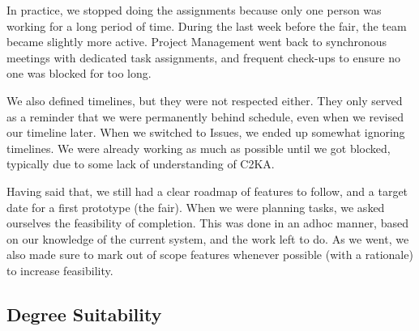In practice, we stopped doing the assignments because only one person was working for a long period of time.
During the last week before the fair, the team became slightly more active.
Project Management went back to synchronous meetings with dedicated task assignments,
and frequent check-ups to ensure no one was blocked for too long.

We also defined timelines, but they were not respected either.
They only served as a reminder that we were permanently behind schedule, even when we revised our timeline later.
When we switched to Issues, we ended up somewhat ignoring timelines.
We were already working as much as possible until we got blocked, typically due to some lack of understanding of C2KA\@.

Having said that, we still had a clear roadmap of features to follow, and a target date for a first prototype (the fair).
When we were planning tasks, we asked ourselves the feasibility of completion.
This was done in an adhoc manner, based on our knowledge of the current system, and the work left to do.
As we went, we also made sure to mark out of scope features whenever possible (with a rationale) to increase feasibility.

\subsection{Degree Suitability}\label{subsec:deg-suit}

